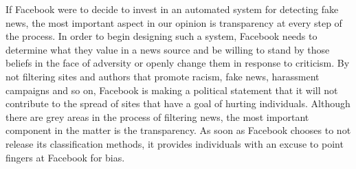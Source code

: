 \documentclass[12pt]{article}
\begin{document}
If Facebook were to decide to invest in an automated system for detecting fake news, the most important aspect in our opinion is transparency at every step of the process. In order to begin designing such a system, Facebook needs to determine what they value in a news source and be willing to stand by those beliefs in the face of adversity or openly change them in response to criticism. By not filtering sites and authors that promote racism, fake news, harassment campaigns and so on, Facebook is making a political statement that it will not contribute to the spread of sites that have a goal of hurting individuals. Although there are grey areas in the process of filtering news, the most important component in the matter is the transparency. As soon as Facebook chooses to not release its classification methods, it provides individuals with an excuse to point fingers at Facebook for bias. 

\newpage
%
%
\printbibliography
\end{document}
